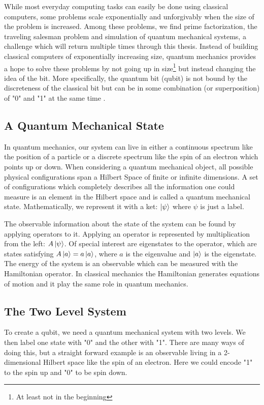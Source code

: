 While most everyday computing tasks can easily be done using classical computers, some problems scale exponentially and unforgivably when the size of the problem is increased. Among these problems, we find prime factorization, the traveling salesman problem and simulation of quantum mechanical systems, a challenge which will return multiple times through this thesis. Instead of building classical computers of exponentially increasing size, quantum mechanics provides a hope to solve these problems by not going up in size\footnote{At least not in the beginning} but instead changing the idea of the bit. More specifically, the quantum bit (qubit) is not bound by the discreteness of the classical bit but can be in some combination (or superposition) of "0" and "1" at the same time \cite{krantz_week_2019}.

\subsection{A Quantum Mechanical State}
In quantum mechanics, our system can live in either a continuous spectrum like the position of a particle or a discrete spectrum like the spin of an electron which points up or down. When considering a quantum mechanical object, all possible physical configurations span a Hilbert Space of finite or infinite dimensions. A set of configurations which completely describes all the information one could measure is an element in the Hilbert space and is called a quantum mechanical state. Mathematically, we represent it with a ket: $\ket{\psi}$ where $\psi$ is just a label. \cite{sakurai_modern_2021}

The observable information about the state of the system can be found by applying operators to it. Applying an operator is represented by multiplication from the left: $A\ket{\psi}$. Of special interest are eigenstates to the operator, which are states satisfying $A\ket{a} = a \ket{a}$, where $a$ is the eigenvalue and $\ket{a}$ is the eigenstate. The energy of the system is an observable which can be measured with the Hamiltonian operator. In classical mechanics the Hamiltonian generates equations of motion and it play the same role in quantum mechanics. \cite{sakurai_modern_2021}

\subsection{The Two Level System}\label{sec:tls}
To create a qubit, we need a quantum mechanical system with two levels. We then label one state with "0" and the other with "1". There are many ways of doing this, but a straight forward example is an observable living in a 2-dimensional Hilbert space like the spin of an electron. Here we could encode "1" to the spin up and "0" to be spin down. 

